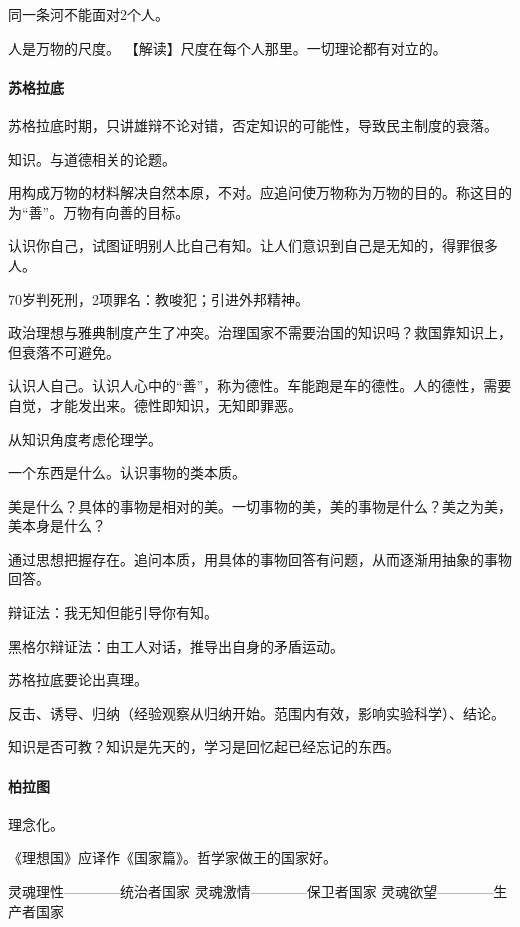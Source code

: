 \documentclass[UTF8]{../RepresentationUniverse}
\begin{document}
        同一条河不能面对2个人。

        人是万物的尺度。
        【解读】尺度在每个人那里。一切理论都有对立的。


        \paragraph{苏格拉底}

        苏格拉底时期，只讲雄辩不论对错，否定知识的可能性，导致民主制度的衰落。

        知识。与道德相关的论题。

        用构成万物的材料解决自然本原，不对。应追问使万物称为万物的目的。称这目的为“善”。万物有向善的目标。

        认识你自己，试图证明别人比自己有知。让人们意识到自己是无知的，得罪很多人。

        70岁判死刑，2项罪名：教唆犯；引进外邦精神。

        政治理想与雅典制度产生了冲突。治理国家不需要治国的知识吗？救国靠知识上，但衰落不可避免。

        认识人自己。认识人心中的“善”，称为德性。车能跑是车的德性。人的德性，需要自觉，才能发出来。德性即知识，无知即罪恶。

        从知识角度考虑伦理学。

        一个东西是什么。认识事物的类本质。

        美是什么？具体的事物是相对的美。一切事物的美，美的事物是什么？美之为美，美本身是什么？

        通过思想把握存在。追问本质，用具体的事物回答有问题，从而逐渐用抽象的事物回答。

        辩证法：我无知但能引导你有知。

        黑格尔辩证法：由工人对话，推导出自身的矛盾运动。

        苏格拉底要论出真理。

        反击、诱导、归纳（经验观察从归纳开始。范围内有效，影响实验科学）、结论。

        知识是否可教？知识是先天的，学习是回忆起已经忘记的东西。


        \paragraph{柏拉图}

        理念化。

        《理想国》应译作《国家篇》。哲学家做王的国家好。

        灵魂理性————统治者国家
        灵魂激情————保卫者国家
        灵魂欲望————生产者国家
\end{document}
